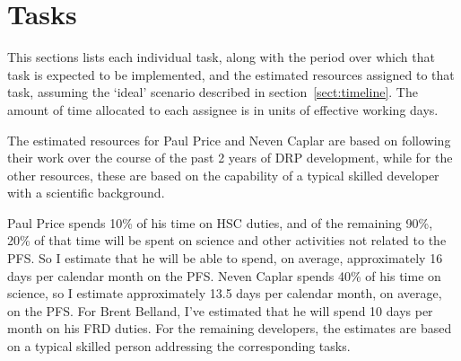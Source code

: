 \section{Tasks}

This sections lists each individual task, along with the period over which that task is expected to be implemented, and the estimated resources assigned to that task, assuming the `ideal' scenario described in section~\ref{sect:timeline}. The amount of time allocated to each assignee is in units of effective working days.

The estimated resources for Paul Price and Neven Caplar are based on following their work over the course of the past 2 years of DRP development, while for the other
resources, these are based on the capability of a typical skilled developer with a scientific background. 

Paul Price spends 10\% of his time on HSC duties, and of the remaining 90\%, 20\% of that time will be spent on science and other activities not related to the PFS. So I estimate that he will be able to spend, on average, approximately 16 days per calendar month on the PFS. Neven Caplar spends 40\% of his time on science, so I estimate approximately 13.5 days per calendar month, on average, on the PFS. For Brent Belland, I've estimated that he will spend 10 days per month on his FRD duties. For the remaining developers, the estimates are based on a typical skilled person addressing the corresponding tasks. 


